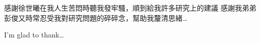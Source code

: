 \begin{acknowledgementszh}
感謝徐世曦在我人生苦悶時聽我發牢騷，順到給我許多研究上的建議
感謝我弟弟彭俊又時常忍受我對研究問題的碎碎念，幫助我釐清思緒\ldots
\end{acknowledgementszh}

\begin{acknowledgementsen}
I'm glad to thank\ldots 
\end{acknowledgementsen}
